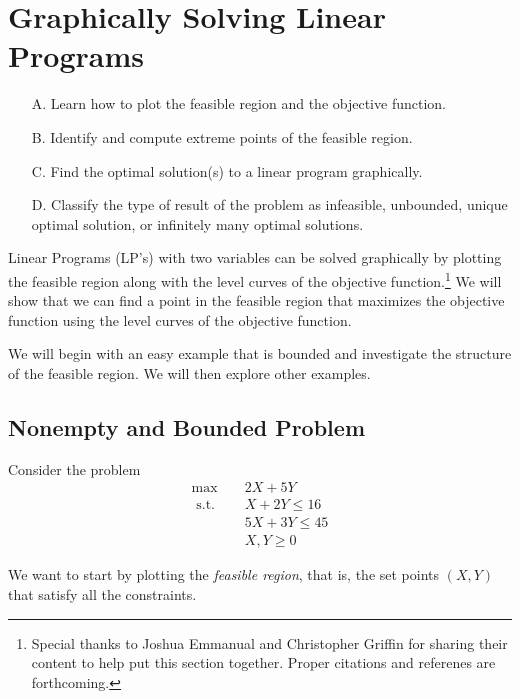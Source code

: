 \chapter{Graphically Solving Linear Programs}
\begin{outcome}

\begin{enumerate}
\item[A.] Learn how to plot the feasible region and the objective function.
\item[B.] Identify and compute extreme points of the feasible region.
\item[C.] Find the optimal solution(s) to a linear program graphically.
\item[D.] Classify the type of result of the problem as infeasible, unbounded, unique optimal solution, or infinitely many optimal solutions.
\end{enumerate}
\end{outcome}

Linear Programs (LP's) with two variables can be solved graphically by plotting the feasible region along with the level curves of the objective function.\footnote{Special thanks to Joshua Emmanual and Christopher Griffin for sharing their content to help put this section together. Proper citations and referenes are forthcoming.} We will show that we can find a point in the feasible region that maximizes the objective function using the level curves of the objective function.

We will begin with an easy example that is bounded and investigate the structure of the feasible region.  We will then explore other examples.
\section{Nonempty and Bounded Problem}
Consider the problem
\begin{align*}
\max \quad & 2 X+5 Y \\
\text { s.t. } \quad 
&X+2 Y \leq 16 \\
&5 X+3 Y \leq  45 \\
&X, Y  \geq 0
\end{align*}

We want to start by plotting the \emph{feasible region}, that is, the set points $(X,Y)$ that satisfy all the constraints. 

